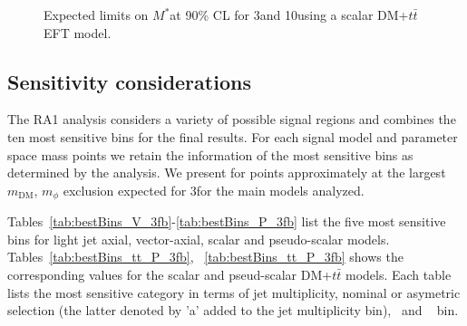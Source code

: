 \begin{table}[h!]
\begin{figure}[h!]
  \centering
  \caption{\label{fig:DMtt_EFT_limit} Expected limits on $M^*$at 90\% CL for 3\fbinv and 10\fbinv using a scalar DM+$t\bar{t}$ EFT model. }
\end{figure}



\clearpage
\subsection{Sensitivity considerations}

The RA1 analysis considers a variety of possible signal regions and combines the ten most sensitive bins for the final results. For each signal model and parameter space mass points we retain the information of the most sensitive bins as determined by the analysis. We present for points approximately at the largest $m_\textrm{DM}$, $m_\phi$ exclusion expected for 3\fbinv for the main models analyzed.

Tables~\ref{tab:bestBins_V_3fb}-\ref{tab:bestBins_P_3fb} list the five most sensitive bins for light jet axial, vector-axial, scalar and pseudo-scalar models. Tables~\ref{tab:bestBins_tt_P_3fb}, ~\ref{tab:bestBins_tt_P_3fb} shows the corresponding values for the scalar and pseud-scalar DM+$t\bar{t}$ models. Each table lists the most sensitive category in terms of jet multiplicity, nominal or asymetric selection (the latter denoted by 'a' added to the jet multiplicity bin), \HT~and \MHT~ bin.



\end{table}
